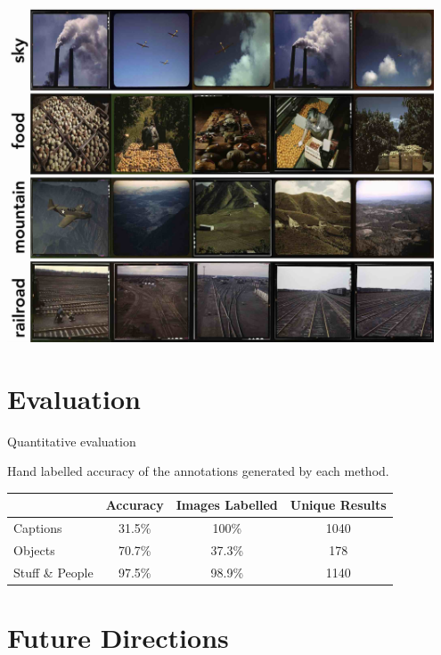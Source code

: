 \documentclass[12pt,ignorenonframetext,aspectratio=169]{beamer}
\begin{document}
\begin{frame}{}

\begin{center}
\includegraphics[width=0.95\textwidth]{../figures/max_category_grid_labels_bottom.jpg}
\end{center}

\end{frame}

\section{Evaluation}

\begin{frame}{Quantitative evaluation}
\centering

Hand labelled accuracy of the annotations generated by each method.

\begin{tabular}{lccc}
 \hline
 & \textbf{Accuracy} & \textbf{Images Labelled} & \textbf{Unique Results} \\
 \hline
Captions & 31.5\% & 100\% & 1040 \\
Objects & 70.7\% & 37.3\% & 178 \\
Stuff \& People & 97.5\% & 98.9\% & 1140 \\
  \hline
\end{tabular}

\end{frame}

\section{Future Directions}
\end{document}
